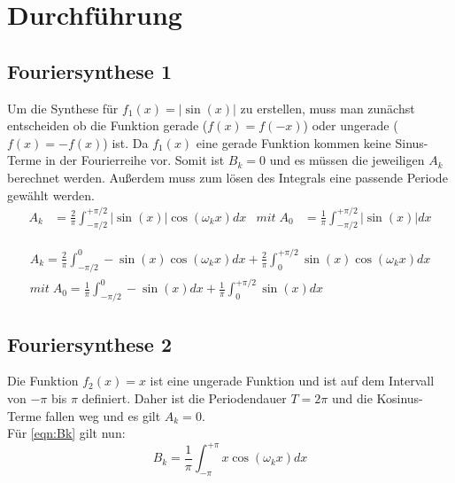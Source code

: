 \newpage
\section{Durchführung}
\subsection{Fouriersynthese 1}
    Um die Synthese für $f_1(x) = |\sin(x)|$ zu erstellen, muss man zunächst entscheiden ob die Funktion gerade ($f(x)=f(-x)$) oder ungerade ($f(x)=-f(x)$) ist.
    Da $f_1(x)$ eine gerade Funktion kommen keine Sinus-Terme in der Fourierreihe vor.
    Somit ist $B_k = 0$ und es müssen die jeweiligen $A_k$ berechnet werden.
    Außerdem muss zum lösen des Integrals eine passende Periode gewählt werden.
    \begin{align}
        A_k &= \frac{2}{\pi}\int_{-\pi/2}^{+\pi/2} |\sin(x)|\cos(\omega_k x)dx & mit\; A_0 &= \frac{1}{\pi}\int_{-\pi/2}^{+\pi/2} |\sin(x)|dx  \label{eqn:Aksin} 
    \end{align}

    
    \begin{gather}
        A_k = \frac{2}{\pi}\int_{-\pi/2}^{0} -\sin(x)\cos(\omega_k x)dx + \frac{2}{\pi}\int_{0}^{+\pi/2} \sin(x)\cos(\omega_k x)dx \\
        
        mit \; A_0 = \frac{1}{\pi}\int_{-\pi/2}^{0} -\sin(x)dx +\frac{1}{\pi}\int_{0}^{+\pi/2} \sin(x)dx
    \end{gather}

\subsection{Fouriersynthese 2}
    Die Funktion $f_2(x) = x$ ist eine ungerade Funktion und ist auf dem Intervall von $-\pi$ bis $\pi$ definiert.
    Daher ist die Periodendauer $T = 2\pi$ und die Kosinus-Terme fallen weg und es gilt $A_k = 0$.\\
    Für \eqref{eqn:Bk} gilt nun:
    \begin{equation}
        B_k = \frac{1}{\pi}\int_{-\pi}^{+\pi} x\cos(\omega_k x)dx
    \end{equation}
\label{sec:Durchführung}
